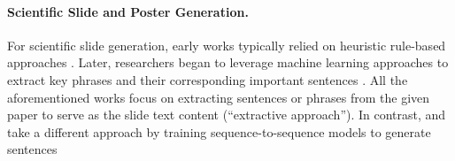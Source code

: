 \paragraph{Scientific Slide and Poster Generation.} For scientific slide generation, early works 
typically relied on heuristic rule-based approaches \cite{Sravanthi2009SlidesGenAG}. 
Later, researchers began to leverage machine learning approaches to extract key phrases and their corresponding important sentences \cite{Hu2013PPSGenLT,Wang2017PhraseBasedPS, Li2021TowardsTS}. 
All the aforementioned works focus on extracting sentences or phrases from the given paper to serve as the slide text content (``extractive approach''). In contrast, \citet{Fu2021DOC2PPTAP} and \citet{sun-etal-2021-d2s} take a different approach by training sequence-to-sequence models to generate sentences %
